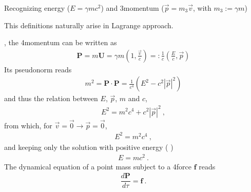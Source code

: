 \documentclass[letterpaper,10pt,english]{jupyterBook}
\begin{document}
\sphinxAtStartPar
Recognizing energy (\(E = \gamma m c^2\)) and 3\sphinxhyphen{}momentum (\(\vec{p} = m_3 \vec{v}\), with \(m_3 := \gamma m\))%
\begin{footnote}[1]\sphinxAtStartFootnote
This definitions naturally arise in Lagrange approach.
%
\end{footnote}, the 4\sphinxhyphen{}momentum can be written as
\begin{equation*}
\begin{split}\mathbf{P} = m \mathbf{U} = \gamma m \left( 1, \frac{\vec{v}}{c} \right) =: \frac{1}{c} \left( \frac{E}{c}, \vec{p} \right)\end{split}
\end{equation*}
\sphinxAtStartPar
Its pseudo\sphinxhyphen{}norm reads
\begin{equation*}
\begin{split}m^2 = \mathbf{P} \cdot \mathbf{P} = \frac{1}{c^4} \left( E^2 - c^2 |\vec{p}|^2 \right) \end{split}
\end{equation*}
\sphinxAtStartPar
and thus the relation between \(E\), \(\vec{p}\), \(m\) and \(c\),
\begin{equation*}
\begin{split}E^2 = m^2 c^4 + c^2 |\vec{p}|^2 \ ,\end{split}
\end{equation*}
\sphinxAtStartPar
from which, for \(\vec{v} = \vec{0} \rightarrow \vec{p} = \vec{0}\),
\begin{equation*}
\begin{split}E^2 = m^2 c^4 \ ,\end{split}
\end{equation*}
\sphinxAtStartPar
and keeping only the solution with positive energy ( )
\begin{equation*}
\begin{split}E = m c^2 \ .\end{split}
\end{equation*}
\sphinxAtStartPar
{} The dynamical equation of a point mass subject to a 4\sphinxhyphen{}force \(\mathbf{f}\) reads
\begin{equation}\label{equation:ch/relativity-special/notes:eq:point:dynamics}
\begin{split}\dfrac{d \mathbf{P}}{d \tau} = \mathbf{f} \ .\end{split}
\end{equation}
\end{document}
